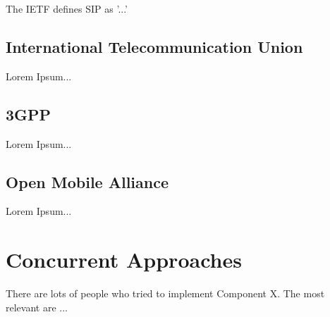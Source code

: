 The IETF defines SIP as '...' \cite{rfcsip}

\subsection{International Telecommunication Union\label{sec:itu}}

Lorem Ipsum...

\subsection{3GPP\label{sec:3gpp}}

Lorem Ipsum...

\subsection{Open Mobile Alliance\label{sec:oma}}

Lorem Ipsum...

\section{Concurrent Approaches \label{sec:summ}}

There are lots of people who tried to implement Component X. The most relevant are ...

